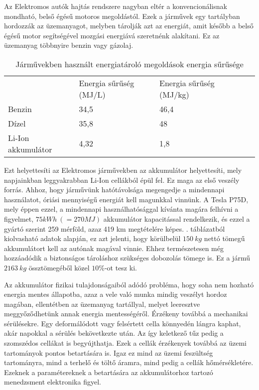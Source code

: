 Az Elektromos autók hajtás rendszere nagyban eltér a konvencionálisnak mondható, belső égésű motoros megoldástól. Ezek a járművek egy tartályban hordozzák az üzemanyagot, melyben tárolják azt az energiát, amit később a belső égésű motor segítségével mozgási energiává szeretnénk alakítani. Ez az üzemanyag többnyire benzin vagy gázolaj.

\begin{table}[h]
\centering
\caption{Járművekben használt energiatároló megoldások energia sűrűsége\cite{wiki_dens}}
\label{density}
\begin{tabular}{l|l|lll}
                   & \multicolumn{1}{l|}{Energia sűrűség (MJ/L)} & \multicolumn{1}{l}{Energia sűrűség (MJ/kg)} &  &  \\ \cline{1-3}
Benzin             & 34,5                                       & 46,4                                       &  &  \\ \cline{1-3}
Dízel              & 35,8                                       & 48                                         &  &  \\ \cline{1-3}
Li-Ion akkumulátor & 4,32                                       & 1,8                                        &  & 
\end{tabular}
\end{table}

Ezt helyettesíti az Elektromos járművekben az akkumulátor helyettesíti, mely napjainkban leggyakrabban Li-Ion cellákból épül fel. Ez maga az első veszély forrás. Ahhoz, hogy járművünk hatótávolsága megengedje a mindennapi használatot, óriási mennyiségű energiát kell magunkkal vinnünk. A Tesla P75D, mely éppen ezzel, a mindennapi használhatósággal kívánta magára felhívni a figyelmet, $75 kWh\ ( = 270 MJ)$ akkumulátor kapacitással rendelkezik, és ezzel a gyártó szerint 259 mérföld, azaz 419 km megtételére képes. . táblázatból kiolvasható adatok alapján, ez azt jelenti, hogy körülbelül  $150\ kg$ nettó tömegű akkumulátort kell az autónak magával vinnie. Ehhez természetesen még hozzáadódik a biztonságos tároláshoz szükséges dobozolás tömege is. Ez a jármű $2163\ kg$ össztömegéből közel $10 \%$-ot tesz ki.

Az akkumulátor fizikai tulajdonságaiból adódó probléma, hogy soha nem hozható energia mentes állapotba, azaz a vele való munka mindig veszélyt hordoz magában, ellentétben az üzemanyag tartállyal, melyet leeresztve meggyőződhetünk annak energia mentességéről. Érzékeny továbbá a mechanikai sérülésekre. Egy deformálódott vagy felsértett cella könnyedén lángra kaphat, akár napokkal a sérülés bekövetkezte után. Az így keletkező tűz pedig a szomszédos cellákat is begyújthatja. Ezek a cellák érzékenyek továbbá az üzemi tartományok pontos betartására is. Igaz ez mind az üzemi feszültség tartományra, mind a terhelő és töltő áramra, mind pedig a cellák hőmérsékletére. Ezeknek a paramétereknek a betartására az akkumulátorhoz tartozó menedzsment elektronika figyel.


